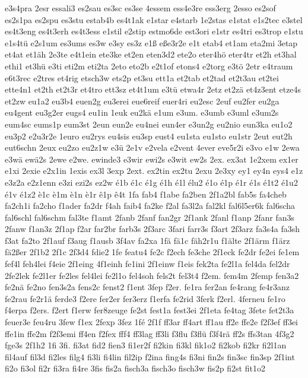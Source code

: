 {e3s4pra
2esr
essali3
es2sau
es3sc
es3se
4essem
ess4e3re
ess3erg
2esso
es2sof
es2s1pa
es2spu
es3stu
estab4b
es4t1ak
e1star
e4starb
1e2stas
e1stat
e1s2tec
e3stel
es4t3eng
es4t3erh
es4t3ess
e1stil
e2stip
estmo6de
est3ori
e1str
es4tri
es3trop
e1stu
e1s4tü
e2s1um
es3ums
es3w
e3sy
es3z
e1ß
eße3r2e
e1t
etab4
et1am
eta2mi
3etap
et4at
et1äh
2e3te
e4t1ein
ete3ke
et2en
eten3d2
ete2o
eter4hö
eter4tr
et2h
et3hal
ethi1
et3hü
e3ti
eti2m
eti2ta
2eto
eto2b
e2t1of
etons4
e2torg
e3tö
2etr
e4traum
e6t3rec
e2tres
et4rig
etsch3w
ets2p
et3su
ett1a
et2tab
et2tad
et2t3au
et2tei
ette4n1
et2th
et2t3r
et4tro
ett3sz
et4t1um
e3tü
etwa4r
2etz
et2zä
et4z3ent
etze4s
et2zw
eu1a2
eu3b4
euen2g
eu3erei
eue6reif
euer4ri
eu2esc
2euf
eu2fer
eu2ga
eu4gent
eu3g2er
eugs4
eu1in
1euk
eu2kä
e1um
e3um.
e3umb
e3uml
e3um2s
eum4sc
eums1p
eum3st
2eun
eun2e
eu4nei
eun4er
e3un2g
eu2nio
eun3ka
eu1o2
eu3p2
e2u3r2e
1euro
eu2rys
eu4sis
eu3sp
eust4
eu1sta
eu1sto
eu1str
2eut
eut2h
eut6schn
2eux
eu2zo
eu2z1w
e3ü
2e1v
e2vela
e2vent
4ever
eve5r2i
e3vo
e1w
2ewa
e3wä
ewä2s
2ewe
e2we.
ewinde3
e3wir
ewi2s
e3wit
ew2s
2ex.
ex3at
1e2xem
ex1er
e1xi
2exie
e2x1in
1exis
ex3l
3exp
2ext.
ex2tin
ex2tu
2exu
2e3xy
ey1
ey4n
eys4
e1z
e3z2a
e2z1enn
e3zi
ezi2s
ez2w
é1b
é1c
é1g
é1h
é1l
élu2
é1o
é1p
é1r
é1s
é1t2
é1u2
é1v
é1z2
è1c
è1m
è1n
è1r
ê1p
ê4t
1fa
fab4
f1abe
fa2ben
2f1a2bl
fab5s
fa4cheb
fa2ch1i
fa2cho
f1ader
fa2dr
f4ah
faib4
fa2ke
f2al
fa3l2a
fal2kl
fal6l5er6k
fal6scha
fal6schl
fal6schm
fal3te
f1amt
2fanb
2fanf
fan2gr
2f1ank
2fanl
f1anp
2fanr
fan3s
2fanw
f1an3z
2f1ap
f2ar
far2br
farb3s
2f3arc
3fari
farr3s
f3art
2f3arz
fa3s4a
fa3sh
f3at
fa2to
2f1auf
f3aug
f1ausb
3f4av
fa2xa
1fä
fä1c
fäh2r1u
f1älte
2f1ärm
f1ärz
fä2ßer
2f1b2
2f1c
2f3d4
fdie2
1fe
featu4
fe2c
f2ech
fe3che
2f1eck
fe2dr
fe2ei
fe1em
fef4l
feh4lei
f4eie
2f1eing
4f1einh
fe1ini
2f1einw
f1eis
fek2ta
fe2l1a
fel4da
fel2dr
2fe2lek
fe2l1er
fe2les
fel4lei
fe2l1o
fel4soh
fels2t
fel3t4
f2em.
fem4m
2femp
fen3a2
fe2nä
fe2no
fen3s2a
fens2c
fenst2
f1ent
3fep
f2er.
fe1ra
fer2an
fe4rang
fe4r3anz
fe2rau
fe2r1ä
ferde3
f2ere
fer2er
fer3erz
f1erfa
fe2rid
3ferk
f2erl.
4ferneu
fe1ro
f4erpa
f2ers.
f2ert
f1erw
fer8zeuge
fe2st
fest1a
fest3ei
2f1eta
fe4tag
3fete
fet2t3a
feuer3e
feu4ru
3few
f1ex
2fexp
3fez
1fé
2f1f
ff3ar
ff4art
ff1au
ff2e
ffe2e
f2f3ef
ff3ei
ffe1in
ffe2m
f2f3emi
ff4en
f2fex
fff4
ff3lag
ff3li
f3flu
f3flü
f3f4rä
ff2s
ffs3tan
4f3g2
fge3s
2f1h2
1fi
3fi.
fi3at
fid2
fien3
fi1er2f
fi2kin
fi3kl
fik1o2
fi2kob
fi2kr
fi2l1an
fil4auf
fil3d
fi2les
filg4
fi3li
fi4lin
fil2ip
f2ina
fing4s
fi3ni
fin2s
fin3sc
fin3sp
2f1int
fi2o
fi3ol
fi2r
fi3ra
fi4re
3fis
fis2a
fisch3a
fisch3o
fisch3w
fis2p
fi2st
fit1o2
}
